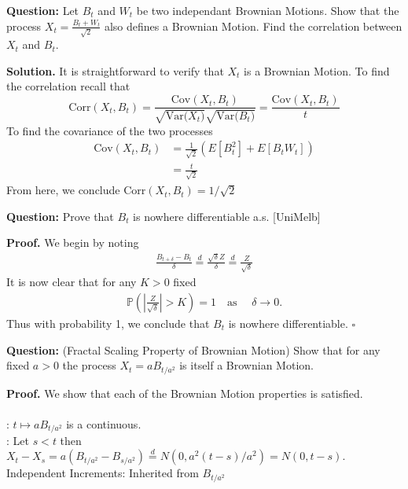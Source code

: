 \documentclass{article}
\begin{document}
\begin{tcolorbox}[colframe=black,colback=gray!5,boxrule=0.5pt]
\textbf{Question:} Let $B_t$ and $W_t$ be two independant Brownian Motions. Show that the process $X_t = \frac{B_t + W_t}{\sqrt{2}}$ also defines a Brownian Motion. Find the correlation between $X_t$ and $B_t$. 
\end{tcolorbox}
\textbf{Solution.} It is straightforward to verify that $X_t$ is a Brownian Motion. To find the correlation recall that 
$$\text{Corr}(X_t, B_t) = \frac{\text{Cov}(X_t, B_t)}{\sqrt{\text{Var($X_t$)}}\sqrt{\text{Var($B_t$)}}} = \frac{\text{Cov}(X_t, B_t)}{t}$$
To find the covariance of the two processes
\begin{align*}
    \text{Cov}(X_t ,B_t) &= \frac{1}{\sqrt{2}}(E[B_t^2] + E[B_tW_t]) \\
    &= \frac{t}{\sqrt{2}}
\end{align*}
From here, we conclude Corr$(X_t, B_t) = 1/\sqrt{2}$

\begin{tcolorbox}[colframe=black,colback=gray!5,boxrule=0.5pt]
\textbf{Question:} Prove that $B_t$ is nowhere differentiable a.s. [UniMelb]  
\end{tcolorbox}
\textbf{Proof.} We begin by noting 
\begin{align*}
    \frac{B_{t+\delta} - B_t}{\delta} \stackrel{d}{=} \frac{\sqrt{\delta} Z}{\delta} \stackrel{d}{=} \frac{Z}{\sqrt{\delta}}
\end{align*}
It is now clear that for any $K > 0$ fixed
\begin{align*}
    \mathbb{P}\left(\left|\frac{Z}{\sqrt{\delta}}\right| > K \right) =1 \quad \text{as } \quad \delta\to0. 
\end{align*}
Thus with probability 1, we conclude that $B_t$ is nowhere differentiable. $\square$

\begin{tcolorbox}[colframe=black,colback=gray!5,boxrule=0.5pt]
\textbf{Question:} (Fractal Scaling Property of Brownian Motion) Show that for any fixed $a>0$  the process $X_t = aB_{t/a^2}$ is itself a Brownian Motion.  
\end{tcolorbox}
\textbf{Proof.} We show that each of the Brownian Motion properties is satisfied. \\
\\
: $t\mapsto aB_{t/a^2}$ is a continuous. \\
: Let $s<t$ then $X_t - X_s = a(B_{t/a^2} - B_{s/a^2}) \stackrel{d}{=} N(0,a^2(t-s)/a^2) = N(0,t-s).$
Independent Increments: Inherited from $B_{t/a^2}$
\end{document}
